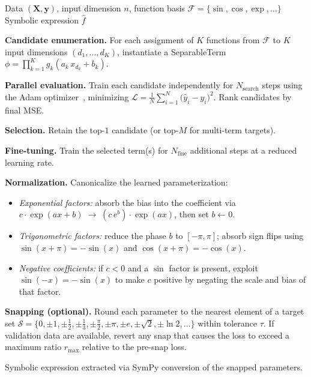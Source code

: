 \begin{algorithm}[t]
\caption{Compositional EML Discovery}
\label{alg:discovery}
\begin{algorithmic}[1]
\REQUIRE Data $(\mathbf{X}, \mathbf{y})$, input dimension $n$,
         function basis $\mathcal{F} = \{\sin, \cos, \exp, \ldots\}$
\ENSURE  Symbolic expression $\hat{f}$

\medskip
\STATE \textbf{Candidate enumeration.}
    For each assignment of $K$ functions from $\mathcal{F}$ to $K$ input
    dimensions $(d_1, \ldots, d_K)$, instantiate a SeparableTerm
    $\phi = \prod_{k=1}^{K} g_k(a_k \, x_{d_k} + b_k)$.
    \hfill {}

\medskip
\STATE \textbf{Parallel evaluation.}
    Train each candidate independently for $N_{\mathrm{search}}$ steps using
    the Adam optimizer~\citep{paszke2019}, minimizing
    $\mathcal{L} = \frac{1}{N}\sum_{i=1}^{N}
    \bigl(\hat{y}_i - y_i\bigr)^2$.
    Rank candidates by final MSE.

\medskip
\STATE \textbf{Selection.}
    Retain the top-$1$ candidate (or top-$M$ for multi-term targets).

\medskip
\STATE \textbf{Fine-tuning.}
    Train the selected term(s) for $N_{\mathrm{fine}}$ additional steps at
    a reduced learning rate.

\medskip
\STATE \textbf{Normalization.}
    Canonicalize the learned parameterization:
    \begin{itemize}
        \item \emph{Exponential factors:}
            absorb the bias into the coefficient via
            $c \cdot \exp(ax + b) \;\to\; (c \, e^{b}) \cdot \exp(ax)$,
            then set $b \leftarrow 0$.
        \item \emph{Trigonometric factors:}
            reduce the phase $b$ to $[-\pi, \pi]$;
            absorb sign flips using $\sin(x + \pi) = -\sin(x)$ and
            $\cos(x + \pi) = -\cos(x)$.
        \item \emph{Negative coefficients:}
            if $c < 0$ and a $\sin$ factor is present, exploit
            $\sin(-x) = -\sin(x)$ to make $c$ positive by negating
            the scale and bias of that factor.
    \end{itemize}

\medskip
\STATE \textbf{Snapping (optional).}
    Round each parameter to the nearest element of a target set
    $\mathcal{S} = \{0, \pm 1, \pm \tfrac{1}{2}, \pm \tfrac{1}{3},
    \pm \tfrac{\pi}{2}, \pm \pi, \pm e, \pm \sqrt{2}, \pm \ln 2, \ldots\}$
    within tolerance $\tau$.
    If validation data are available, revert any snap that causes the loss
    to exceed a maximum ratio $r_{\max}$ relative to the pre-snap loss.

\medskip
\RETURN Symbolic expression extracted via SymPy conversion of the
    snapped parameters.
\end{algorithmic}
\end{algorithm}

